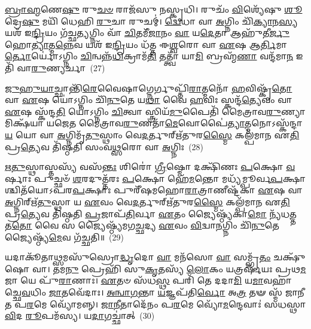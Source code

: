 \-\ul{𑌬𑍍𑌰𑌾}\-\-\ul{𑌹𑍍𑌮}\-𑌣𑍇\-\ul{𑌷𑍁} 𑌰𑍁\-\ul{𑌚}\-\-\ul{𑍞} 𑌰𑌾𑌜᳴𑌸𑍁 𑌨𑌸𑍍𑌕𑍃𑌧𑌿। 𑌰𑍁𑌚𑌂᳴ \ul{𑌵𑌿}\-𑌶𑍍𑌯𑍇᳴𑌷𑍁 \ul{𑌶𑍂}\-𑌦𑍍𑌰𑍇\-\ul{𑌷𑍁} 𑌮𑌯𑌿᳴ 𑌧𑍇𑌹𑌿 \ul{𑌰𑍁}\-𑌚𑌾 𑌰𑍁𑌚𑌮𑍍॑। \ul{𑌦𑍍𑌵𑍇}\-𑌧𑌾 𑌵𑌾 \ul{𑌅}\-𑌗𑍍𑌨𑌿𑌂 𑌚𑌿᳴\-\ul{𑌕𑍍𑌯𑌾}\-𑌨\-\ul{𑌸𑍍𑌯} 𑌯𑌶᳴ 𑌇\-\ul{𑌨𑍍𑌦𑍍𑌰𑌿}\-𑌯𑌂 𑌗᳴𑌚𑍍𑌛\-\ul{𑌤𑍍𑌯}\-𑌗𑍍𑌨𑌿𑌂 𑌵𑌾᳴ \ul{𑌚𑌿}\-𑌤𑌮𑍀᳴\-\ul{𑌜𑌾}\-𑌨𑌂 \ul{𑌵𑌾} 𑌯\-\ul{𑌦𑍇}\-𑌤𑌾 𑌆𑌹𑍁᳴𑌤𑍀\-\ul{𑌰𑍍𑌜𑍁}\-𑌹𑍋\-\ul{𑌤𑍍𑌯𑌾}\-𑌤𑍍𑌮\-\ul{𑌨𑍍𑌨𑍇}\-𑌵 𑌯𑌶᳴ 𑌇\-\ul{𑌨𑍍𑌦𑍍𑌰𑌿}\-𑌯𑌂 𑌧᳴𑌤𑍍𑌤 𑌈\-\ul{𑌶𑍍𑌵}\-𑌰𑍋 𑌵𑌾 \ul{𑌏}\-𑌷 𑌆\-\ul{𑌰𑍍𑌤𑌿}\-𑌮𑌾\-\ul{𑌰𑍍𑌤𑍋}\-𑌰𑍍𑌯𑍋॑\-𑌽𑌗𑍍𑌨𑌿𑌂 \ul{𑌚𑌿}\-𑌨𑍍𑌵𑌨𑍍𑌨᳴\-\ul{𑌧𑌿}\-𑌕𑍍𑌰𑌾𑌮᳴\-\ul{𑌤𑌿} 𑌤𑌤𑍍𑌤𑍍𑌵𑌾᳴ 𑌯𑌾\-\ul{𑌮𑌿} 𑌬𑍍𑌰𑌹𑍍𑌮᳴\-\ul{𑌣𑌾} 𑌵𑌨𑍍𑌦᳴𑌮𑌾\-\ul{𑌨} 𑌇𑌤𑌿᳴ 𑌵𑌾\-\ul{𑌰𑍁}\-𑌣𑍍𑌯𑌰𑍍𑌚𑌾~(27)

\-\ul{𑌜𑍁}\-\-\ul{𑌹𑍁}\-\-\ul{𑌯𑌾}\-𑌚𑍍𑌛𑌾𑌨𑍍𑌤𑌿᳴\-\ul{𑌰𑍇}\-𑌵𑍈𑌷𑌾𑌗𑍍𑌨𑍇𑌰𑍍𑌗𑍁𑌪𑍍𑌤𑌿᳴\-\ul{𑌰𑌾}\-𑌤𑍍𑌮𑌨𑍋᳴ \ul{𑌹}\-𑌵𑌿𑌷𑍍𑌕𑍃᳴\-\ul{𑌤𑍋} 𑌵𑌾 \ul{𑌏}\-𑌷 𑌯𑍋॑\-𑌽𑌗𑍍𑌨𑌿𑌂 𑌚𑌿᳴\-\ul{𑌨𑍁}\-𑌤𑍇 𑌯\-\ul{𑌥𑌾} 𑌵𑍈 \ul{𑌹}\-𑌵𑌿𑌃 𑌸𑍍𑌕𑌨𑍍𑌦᳴\-\ul{𑌤𑍍𑌯𑍇}\-𑌵𑌂 𑌵𑌾 \ul{𑌏}\-𑌷 𑌸𑍍𑌕᳴𑌨𑍍𑌦\-\ul{𑌤𑌿} 𑌯𑍋॑\-𑌽𑌗𑍍𑌨𑌿𑌂 \ul{𑌚𑌿}\-𑌤𑍍𑌵𑌾 𑌸𑍍𑌤𑍍𑌰𑌿𑌯᳴\-\ul{𑌮𑍁}\-𑌪𑍈𑌤𑌿᳴ 𑌮𑍈𑌤𑍍𑌰𑌾𑌵\-\ul{𑌰𑍁}\-𑌣𑍍𑌯𑌾𑌮𑌿𑌕𑍍𑌷᳴𑌯𑌾 𑌯𑌜𑍇𑌤 𑌮𑍈𑌤𑍍𑌰𑌾𑌵\-\ul{𑌰𑍁}\-𑌣𑌤𑌾᳴\-\ul{𑌮𑍇}\-𑌵𑍋𑌪𑍈॑\-\ul{𑌤𑍍𑌯𑌾}\-𑌤𑍍𑌮𑌨𑍋\-𑌽𑌸𑍍𑌕᳴𑌨𑍍𑌦𑌾\-\ul{𑌯} 𑌯𑍋 𑌵𑌾 \ul{𑌅}\-𑌗𑍍𑌨𑌿𑌮𑍃᳴\-\ul{𑌤𑍁}\-𑌸𑍍𑌥𑌾𑌂 𑌵𑍇\-\ul{𑌦}\-𑌰𑍍𑌤𑍁𑌰𑍍\mbox{}𑌋᳴𑌤𑍁𑌰\-\ul{𑌸𑍍𑌮𑍈} 𑌕𑌲𑍍𑌪᳴𑌮𑌾𑌨 𑌏\-\ul{𑌤𑌿} 𑌪𑍍𑌰\-\ul{𑌤𑍍𑌯𑍇}\-𑌵 𑌤𑌿᳴𑌷𑍍𑌠𑌤𑌿 𑌸𑌂𑌵\-\ul{𑌥𑍍𑌸}\-𑌰𑍋 𑌵𑌾 \ul{𑌅}\-𑌗𑍍𑌨𑌿𑌃~(28)

\-\ul{𑌋}\-\-\ul{𑌤𑍁}\-𑌸𑍍𑌥𑌾𑌸𑍍𑌤𑌸𑍍𑌯᳴ 𑌵𑌸᳴\-\ul{𑌨𑍍𑌤𑌃} 𑌶𑌿𑌰𑍋॑ \ul{𑌗𑍍𑌰𑍀}\-𑌷𑍍𑌮𑍋 𑌦𑌕𑍍𑌷𑌿᳴𑌣𑌃 \ul{𑌪}\-𑌕𑍍𑌷𑍋 \ul{𑌵}\-𑌰𑍍\mbox{}𑌷𑌾𑌃 𑌪𑍁𑌚𑍍𑌛𑍞᳴ \ul{𑌶}\-𑌰𑌦𑍁𑌤𑍍𑌤᳴𑌰𑌃 \ul{𑌪}\-𑌕𑍍𑌷𑍋 𑌹𑍇᳴\-\ul{𑌮}\-𑌨𑍍𑌤𑍋 𑌮𑌧𑍍𑌯᳴𑌮𑍍𑌪𑍂𑌰𑍍𑌵\-\ul{𑌪}\-𑌕𑍍𑌷𑌾𑌶𑍍𑌚𑌿𑌤᳴𑌯𑍋\-𑌽𑌪𑌰\-\ul{𑌪}\-𑌕𑍍𑌷𑌾𑌃 𑌪𑍁𑌰𑍀᳴𑌷𑌮𑌹𑍋\-\ul{𑌰𑌾}\-𑌤𑍍𑌰𑌾𑌣𑍀𑌷𑍍𑌟᳴𑌕𑌾 \ul{𑌏}\-𑌷 𑌵𑌾 \ul{𑌅}\-𑌗𑍍𑌨𑌿𑌰𑍍\mbox{}𑌋᳴\-\ul{𑌤𑍁}\-𑌸𑍍𑌥𑌾 𑌯 \ul{𑌏}\-𑌵𑌂 𑌵𑍇\-\ul{𑌦}\-𑌰𑍍𑌤𑍁𑌰𑍍\mbox{}𑌋᳴𑌤𑍁𑌰\-\ul{𑌸𑍍𑌮𑍈} 𑌕𑌲𑍍𑌪᳴𑌮𑌾𑌨 𑌏\-\ul{𑌤𑌿} 𑌪𑍍𑌰\-\ul{𑌤𑍍𑌯𑍇}\-𑌵 𑌤𑌿᳴𑌷𑍍𑌠𑌤𑌿 \ul{𑌪𑍍𑌰}\-𑌜𑌾𑌪᳴\-\ul{𑌤𑌿}\-𑌰𑍍𑌵𑌾 \ul{𑌏}\-𑌤𑌂 𑌜𑍍𑌯𑍈𑌷𑍍𑌠𑍍𑌯᳴𑌕𑌾\-\ul{𑌮𑍋} 𑌨𑍍𑌯᳴𑌧\-\ul{𑌤𑍍𑌤} 𑌤\-\ul{𑌤𑍋} 𑌵𑍈 𑌸 𑌜𑍍𑌯𑍈𑌷𑍍𑌠𑍍𑌯᳴𑌮𑌗\-\ul{𑌚𑍍𑌛}\-𑌦𑍍𑌯 \ul{𑌏}\-𑌵𑌂 \ul{𑌵𑌿}\-𑌦𑍍𑌵𑌾\-\ul{𑌨}\-𑌗𑍍𑌨𑌿𑌂 𑌚𑌿᳴\-\ul{𑌨𑍁}\-𑌤𑍇 𑌜𑍍𑌯𑍈𑌷𑍍𑌠𑍍𑌯᳴\-\ul{𑌮𑍇}\-𑌵 𑌗᳴𑌚𑍍𑌛𑌤𑌿॥~(29)

{\anuvakamend[{\-\ul{𑌪𑍃}\-\-\ul{𑌥𑌿}\-𑌵𑍀𑌂 𑌯᳴\-\ul{𑌚𑍍𑌛} 𑌯𑌥𑍍𑌸𑍍𑌵᳴𑌯𑌮𑌾\-\ul{𑌤𑍃}\-𑌣𑍍𑌣𑌾 𑌉᳴\-\ul{𑌪}\-𑌧𑌾𑌯᳴ 𑌧𑍇\-\ul{𑌹𑍍𑌯𑍃}\-𑌚𑌾𑌗𑍍𑌨𑌿𑌶𑍍𑌚𑌿᳴\-\ul{𑌨𑍁}\-𑌤𑍇 𑌤𑍍𑌰𑍀𑌣𑌿᳴ 𑌚}]}%

𑌯𑌦𑌾𑌕𑍂᳴𑌤𑌾\-\ul{𑌥𑍍𑌸}\-𑌮𑌸𑍁᳴𑌸𑍍𑌰𑍋\-\ul{𑌦𑍍𑌧𑍃}\-𑌦𑍋 \ul{𑌵𑌾} 𑌮𑌨᳴𑌸𑍋 \ul{𑌵𑌾} 𑌸𑌮𑍍𑌭𑍃᳴\-\ul{𑌤𑌂} 𑌚𑌕𑍍𑌷𑍁᳴𑌷𑍋 𑌵𑌾। 𑌤𑌮\-\ul{𑌨𑍁} 𑌪𑍍𑌰𑍇𑌹𑌿᳴ 𑌸𑍁\-\ul{𑌕𑍃}\-𑌤𑌸𑍍𑌯᳴ \ul{𑌲𑍋}\-𑌕𑌂 𑌯𑌤𑍍𑌰𑌰𑍍\mbox{}𑌷᳴𑌯𑌃 𑌪𑍍𑌰𑌥\-\ul{𑌮}\-𑌜𑌾 𑌯𑍇 𑌪𑍁᳴\-\ul{𑌰𑌾}\-𑌣𑌾𑌃। \ul{𑌏}\-𑌤𑍞 𑌸᳴𑌧\-\ul{𑌸𑍍𑌥} 𑌪𑌰𑌿᳴ 𑌤𑍇 𑌦𑌦𑌾\-\ul{𑌮𑌿} 𑌯\-\ul{𑌮𑌾}\-𑌵𑌹𑌾॑𑌚𑍍𑌛𑍇\-\ul{𑌵}\-𑌧𑌿𑌂 \ul{𑌜𑌾}\-𑌤𑌵𑍇᳴𑌦𑌾𑌃। \ul{𑌅}\-\-\ul{𑌨𑍍𑌵𑌾}\-\-\ul{𑌗}\-𑌨𑍍𑌤𑌾 \ul{𑌯}\-𑌜𑍍𑌞𑌪᳴𑌤𑌿\-\ul{𑌰𑍍𑌵𑍋} 𑌅\-\ul{𑌤𑍍𑌰} 𑌤𑍟 𑌸𑍍𑌮᳴ 𑌜𑌾𑌨𑍀𑌤 𑌪\-\ul{𑌰}\-𑌮𑍇 𑌵𑍍𑌯𑍋᳴𑌮𑌨𑍍𑌨𑍍। \ul{𑌜𑌾}\-\-\ul{𑌨𑍀}\-𑌤𑌾𑌦𑍇᳴𑌨𑌂 𑌪\-\ul{𑌰}\-𑌮𑍇 𑌵𑍍𑌯𑍋᳴\-\ul{𑌮}\-𑌨𑍍𑌦𑍇𑌵𑌾𑌃॑ 𑌸𑌧𑌸𑍍𑌥𑌾 \ul{𑌵𑌿}\-𑌦 \ul{𑌰𑍂}\-𑌪𑌮᳴𑌸𑍍𑌯। 𑌯\-\ul{𑌦𑌾}\-𑌗𑌚𑍍𑌛𑌾॑𑌤𑍍~(30)

